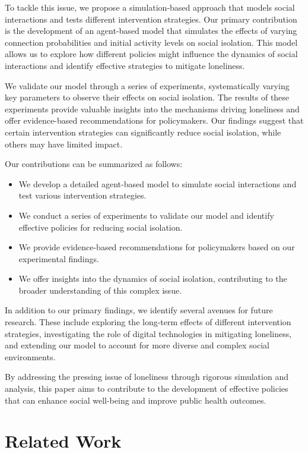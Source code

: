 \documentclass{article} %
\begin{document}
To tackle this issue, we propose a simulation-based approach that models social interactions and tests different intervention strategies. Our primary contribution is the development of an agent-based model that simulates the effects of varying connection probabilities and initial activity levels on social isolation. This model allows us to explore how different policies might influence the dynamics of social interactions and identify effective strategies to mitigate loneliness.

We validate our model through a series of experiments, systematically varying key parameters to observe their effects on social isolation. The results of these experiments provide valuable insights into the mechanisms driving loneliness and offer evidence-based recommendations for policymakers. Our findings suggest that certain intervention strategies can significantly reduce social isolation, while others may have limited impact.

Our contributions can be summarized as follows:
\begin{itemize}
    \item We develop a detailed agent-based model to simulate social interactions and test various intervention strategies.
    \item We conduct a series of experiments to validate our model and identify effective policies for reducing social isolation.
    \item We provide evidence-based recommendations for policymakers based on our experimental findings.
    \item We offer insights into the dynamics of social isolation, contributing to the broader understanding of this complex issue.
\end{itemize}

In addition to our primary findings, we identify several avenues for future research. These include exploring the long-term effects of different intervention strategies, investigating the role of digital technologies in mitigating loneliness, and extending our model to account for more diverse and complex social environments.

By addressing the pressing issue of loneliness through rigorous simulation and analysis, this paper aims to contribute to the development of effective policies that can enhance social well-being and improve public health outcomes.

\section{Related Work}
\label{sec:related}
\end{document}
